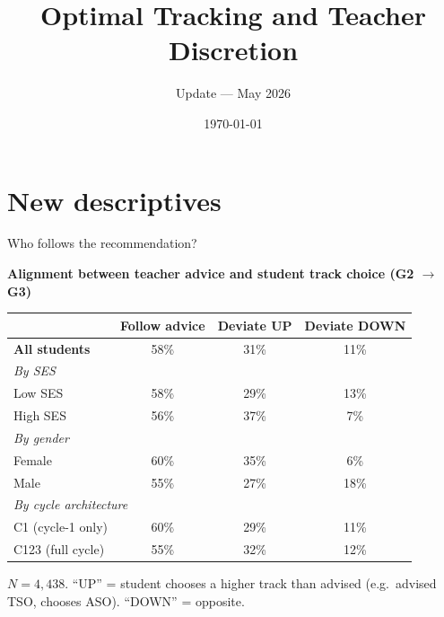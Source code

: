 \documentclass[10pt,aspectratio=169]{beamer}
\title{Optimal Tracking and Teacher Discretion}
\subtitle{Update --- May 2026}
\date{\today}
\begin{document}
\maketitle

\section{New descriptives}

\begin{frame}{Who follows the recommendation?}
\centering
\scriptsize
\setlength{\tabcolsep}{6pt}

\textbf{Alignment between teacher advice and student track choice (G2 $\to$ G3)}

\bigskip

\begin{tabular}{lccc}
\toprule
 & Follow advice & Deviate UP & Deviate DOWN \\
\midrule
\textbf{All students} & 58\% & 31\% & 11\% \\
\midrule
\multicolumn{4}{l}{\textit{By SES}} \\
\quad Low SES & 58\% & 29\% & 13\% \\
\quad High SES & 56\% & 37\% & 7\% \\
\midrule
\multicolumn{4}{l}{\textit{By gender}} \\
\quad Female & 60\% & 35\% & 6\% \\
\quad Male & 55\% & 27\% & 18\% \\
\midrule
\multicolumn{4}{l}{\textit{By cycle architecture}} \\
\quad C1 (cycle-1 only) & 60\% & 29\% & 11\% \\
\quad C123 (full cycle) & 55\% & 32\% & 12\% \\
\bottomrule
\end{tabular}

\bigskip
\flushleft
\footnotesize
$N = 4{,}438$. ``UP'' = student chooses a higher track than advised (e.g.\ advised TSO, chooses ASO). ``DOWN'' = opposite.
\end{frame}
\end{document}
